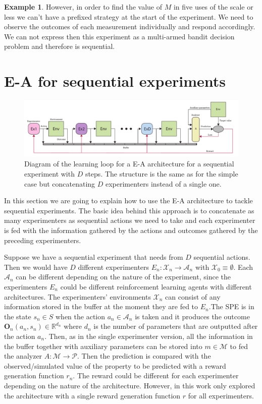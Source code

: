\documentclass[11pt,a4paper,twoside]{report}
\newcommand{\+}{\textnormal{+} }
\theoremstyle{definition}
\newtheorem{myex}[mythm]{Example}
\numberwithin{equation}{chapter}
\begin{document}
\begin{myex}
However, in order to find the value of $M$ in five uses of the scale or less we
can't have a prefixed strategy at the start of the experiment. We need to
observe the outcomes of each measurement individually and respond accordingly.
We can not express then this experiment as a multi-armed bandit decision
problem and therefore is sequential.

\end{myex}

\section{E-A for sequential experiments}

\begin{figure}[t]
  \includegraphics[width=\columnwidth]{figures/sequential-EA.pdf}
  \caption{Diagram of the learning loop for a E-A architecture for a 
  sequential experiment with $D$ steps. The structure is the same as for 
  the simple case but concatenating $D$ experimenters instead of a single one.}
  \label{fig:SequentialEA}
\end{figure}

In this section we are going to explain how to use the E-A architecture to
tackle sequential experiments. The basic idea behind this approach is to
concatenate as many experimenters as sequential actions we need to take and each
experimenter is fed with the information gathered by the actions and outcomes
gathered by the preceding experimenters. 

Suppose we have a sequential experiment that needs from $D$ sequential actions.
Then we would have $D$ different experimenters $E_n:\mathcal{X}_n\rightarrow
\mathcal{A}_n$ with $\mathcal{X}_0\equiv\emptyset$. Each $\mathcal{A}_n$ can be
different depending on the nature of the experiment, since the experimenters
$E_n$ could be different reinforcement learning agents with different
architectures. The experimenters' environments $\mathcal{X}_n$ can consist of
any information stored in the buffer at the moment they are fed to $E_n$.The SPE
is in the state $s_n \in S$ when the action $a_n \in \mathcal{A}_n$ is taken and
it produces the outcome $\textbf{O}_n(a_n, s_n) \in \mathbb{R}^{d_n}$ where
$d_n$ is the number of parameters that are outputted after the action $a_n$.
Then, as in the single experimenter version, all the information in the buffer
together with auxiliary parameters can be stored into $m\in\mathcal{M}$ to fed
the analyzer $A:\mathcal{M}\rightarrow \mathcal{P}$. Then the prediction is
compared with the observed/simulated value of the property to be predicted
with a reward generation function $r_n$. The reward could be different for each
experimenter depending on the nature of the architecture. However, in this work
only explored the architecture with a single reward generation function $r$ for
all experimenters.
\end{document}
